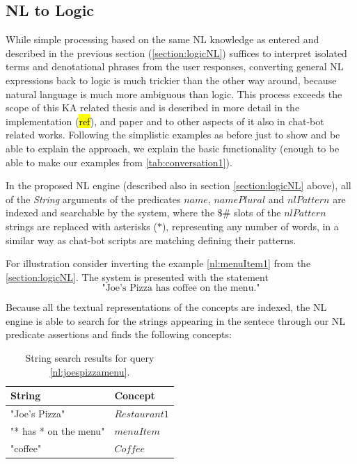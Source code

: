\subsection{NL to Logic}
\label{section:NLLogic}
While simple processing based on the same NL knowledge as entered and described
in the previous section (\autoref{section:logicNL}) suffices to interpret 
isolated terms and denotational phrases from the user responses, converting 
general NL expressions back to logic is much trickier than the other way 
around, because natural language is much more ambiguous than logic. This 
process exceeds the scope of this KA related thesis and is 
described in more detail in the implementation (\hl{ref}), and paper 
\parencite{Schneider2015} and to other aspects of it also in chat-bot related
works\parencite{Wallace2013,Wilcox2011}. Following the simplistic examples as
before just to show and be able to explain the approach, we explain the basic 
functionality (enough to be able to make our examples from 
\autoref{tab:conversation1}).

In the proposed NL engine (described also in section \ref{section:logicNL}
above), all of the \emph{String} arguments of the predicates $name$, 
$namePlural$ and $nlPattern$ are indexed and searchable by the system, where
the $\$\#$ slots of the $nlPattern$ strings are replaced with asterisks ($*$),
representing any number of words, in a similar way as chat-bot scripts are
matching defining their patterns\parencite{Wilcox2011}.

For illustration consider inverting the example \ref{nl:menuItem1} from the
\autoref{section:logicNL}. The system is presented with the statement
\begin{equation}\label{nl:joespizzamenu}
\text{"Joe's Pizza has coffee on the menu."}
\end{equation}

Because all the textual representations of the concepts are indexed, the NL
engine is able to search for the strings appearing in the sentece through
our NL predicate assertions and finds the following concepts:
\begin{table}[H]
\centering
\caption{String search results for query \ref{nl:joespizzamenu}.}
\label{tab:nlResults1}
\begin{tabular}{|l|l|}
	\hline
	\textbf{String} & \textbf{Concept} \\
    \hline
    "Joe's Pizza" & $Restaurant1$ \\
    \hline
    "* has * on the menu" & $menuItem$ \\
    \hline
    "coffee" & $Coffee$ \\
    \hline
\end{tabular}
\end{table}

